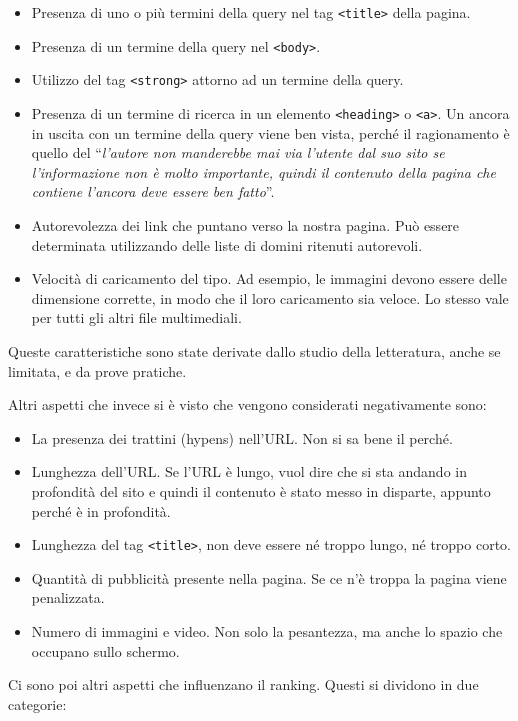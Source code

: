 \begin{itemize}
	\item Presenza di uno o più termini della query nel tag \texttt{<title>} della pagina.
	\item Presenza di un termine della query nel \texttt{<body>}.
	\item Utilizzo del tag \texttt{<strong>} attorno ad un termine della query.
	\item Presenza di un termine di ricerca in un elemento \texttt{<heading>} o \texttt{<a>}. Un ancora in uscita con un termine della query viene ben vista, perché il ragionamento è quello del ``\textit{l'autore non manderebbe mai via l'utente dal suo sito se l'informazione non è molto importante, quindi il contenuto della pagina che contiene l'ancora deve essere ben fatto}''.
	\item Autorevolezza dei link che puntano verso la nostra pagina. Può essere determinata utilizzando delle liste di domini ritenuti autorevoli.
	\item Velocità di caricamento del tipo. Ad esempio, le immagini devono essere delle dimensione corrette, in modo che il loro caricamento sia veloce. Lo stesso vale per tutti gli altri file multimediali.
\end{itemize}

Queste caratteristiche sono state derivate dallo studio della letteratura, anche se limitata, e da prove pratiche.

Altri aspetti che invece si è visto che vengono considerati negativamente sono:

\begin{itemize}
	\item La presenza dei trattini (hypens) nell'URL. Non si sa bene il perché.
	\item Lunghezza dell'URL. Se l'URL è lungo, vuol dire che si sta andando in profondità del sito e quindi il contenuto è stato messo in disparte, appunto perché è in profondità.
	\item Lunghezza del tag \texttt{<title>}, non deve essere né troppo lungo, né troppo corto.
	\item Quantità di pubblicità presente nella pagina. Se ce n'è troppa la pagina viene penalizzata.
	\item Numero di immagini e video. Non solo la pesantezza, ma anche lo spazio che occupano sullo schermo.
\end{itemize}

Ci sono poi altri aspetti che influenzano il ranking. Questi si dividono in due categorie:

